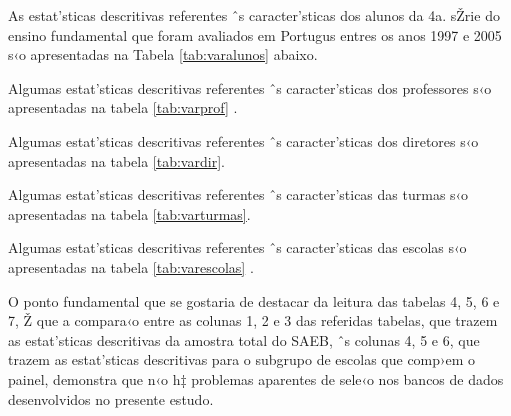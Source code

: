 \documentclass[a4paper, 12pt]{article}
\begin{document}
As estat’sticas descritivas referentes ˆs caracter’sticas dos alunos da 4a. sŽrie do ensino fundamental que foram avaliados em Portugus entres os anos 1997 e 2005 s‹o apresentadas na Tabela \ref{tab:varalunos} abaixo. 


\vspace*{1cm} 





Algumas estat’sticas descritivas referentes ˆs caracter’sticas dos professores s‹o apresentadas na tabela \ref{tab:varprof} . 





Algumas estat’sticas descritivas referentes ˆs caracter’sticas dos diretores s‹o apresentadas na tabela \ref{tab:vardir}.  






Algumas estat’sticas descritivas referentes ˆs caracter’sticas das turmas s‹o apresentadas na tabela \ref{tab:varturmas}.   




Algumas estat’sticas descritivas referentes ˆs caracter’sticas das escolas s‹o apresentadas na tabela \ref{tab:varescolas} .  







O ponto fundamental que se gostaria de destacar da leitura das tabelas 4, 5, 6 e 7, Ž que a compara‹o entre as colunas 1, 2 e 3 das referidas tabelas, que trazem as estat’sticas descritivas da amostra total do SAEB, ˆs colunas 4, 5 e 6, que trazem as estat’sticas descritivas para o subgrupo de escolas que comp›em o painel, demonstra que n‹o h‡ problemas aparentes de sele‹o nos bancos de dados desenvolvidos no presente estudo.
\end{document}
